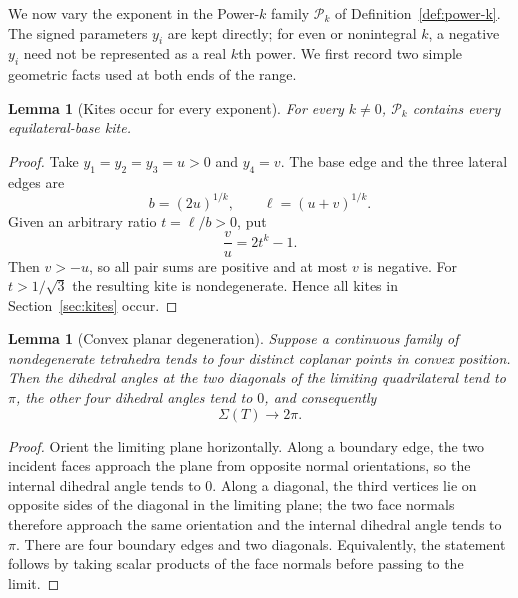 \documentclass[11pt,a4paper]{article}
\newtheorem{lemma}[theorem]{Lemma}
\theoremstyle{definition}
\theoremstyle{remark}
\begin{document}
We now vary the exponent in the Power-$k$ family $\mathcal P_k$ of
Definition~\ref{def:power-k}.  The signed parameters $y_i$ are kept directly;
for even or nonintegral $k$, a negative $y_i$ need not be represented as a
real $k$th power.  We first record two simple geometric facts used at both
ends of the range.

\begin{lemma}[Kites occur for every exponent]\label{lem:all-k-kites}
For every $k\ne0$, $\mathcal P_k$ contains every equilateral-base
kite.
\end{lemma}

\begin{proof}
Take $y_1=y_2=y_3=u>0$ and $y_4=v$.  The base edge and the three lateral
edges are
\[
 b=(2u)^{1/k},\qquad \ell=(u+v)^{1/k}.
\]
Given an arbitrary ratio $t=\ell/b>0$, put
\begin{equation}\label{eq:kite-power-parameter}
 \frac vu=2t^k-1.
\end{equation}
Then $v>-u$, so all pair sums are positive and at most $v$ is negative.
For $t>1/\sqrt3$ the resulting kite is nondegenerate.  Hence all kites in
Section~\ref{sec:kites} occur.
\end{proof}

\begin{lemma}[Convex planar degeneration]\label{lem:convex-planar}
Suppose a continuous family of nondegenerate tetrahedra tends to four
distinct coplanar points in convex position.  Then the dihedral angles at
the two diagonals of the limiting quadrilateral tend to $\pi$, the other
four dihedral angles tend to $0$, and consequently
\begin{equation}\label{eq:convex-planar-limit}
 \Sigma(T)\longrightarrow2\pi.
\end{equation}
\end{lemma}

\begin{proof}
Orient the limiting plane horizontally.  Along a boundary edge, the two
incident faces approach the plane from opposite normal orientations, so the
internal dihedral angle tends to $0$.  Along a diagonal, the third vertices
lie on opposite sides of the diagonal in the limiting plane; the two face
normals therefore approach the same orientation and the internal dihedral
angle tends to $\pi$.  There are four boundary edges and two diagonals.
Equivalently, the statement follows by taking scalar products of the face
normals before passing to the limit.
\end{proof}
\end{document}
